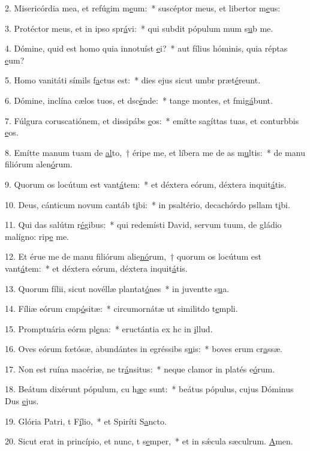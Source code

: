 2. Misericórdia mea, et refúgim m\uline{e}um:~* suscéptor meus, et libertor m\uline{e}us:\par 
3. Protéctor meus, et in ipso spr\uline{á}vi:~* qui subdit pópulum mum s\uline{u}b me.\par 
4. Dómine, quid est homo quia innotuíst \uline{e}i?~* aut fílius hóminis, quia réptas \uline{e}um?\par 
5. Homo vanitáti símils f\uline{a}ctus est:~* dies ejus sicut umbr præt\uline{é}reunt.\par 
6. Dómine, inclína cælos tuos, et dsc\uline{é}nde:~* tange montes, et fmig\uline{á}bunt.\par 
7. Fúlgura coruscatiónem, et dissipábs \uline{e}os:~* emítte sagíttas tuas, et conturbbis \uline{e}os.\par 
8. Emítte manum tuam de \uline{al}to,~† éripe me, et líbera me de as m\uline{u}ltis:~* de manu filiórum alen\uline{ó}rum.\par 
9. Quorum os locútum est vant\uline{á}tem:~* et déxtera eórum, déxtera inquit\uline{á}tis.\par 
10. Deus, cánticum novum cantáb t\uline{i}bi:~* in psaltério, decachórdo psllam t\uline{i}bi.\par 
11. Qui das salútm r\uline{é}gibus:~* qui redemísti David, servum tuum, de gládio malígno: rip\uline{e} me.\par 
12. Et érue me de manu filiórum alie\uline{nó}rum,~† quorum os locútum est vant\uline{á}tem:~* et déxtera eórum, déxtera inquit\uline{á}tis.\par 
13. Quorum fílii, sicut novéllæ plantat\uline{ó}nes~* in juventte s\uline{u}a.\par 
14. Fíliæ eórum cmp\uline{ó}sitæ:~* circumornátæ ut similitdo t\uline{e}mpli.\par 
15. Promptuária eórm pl\uline{e}na:~* eructántia ex hc in \uline{i}llud.\par 
16. Oves eórum fœtósæ, abundántes in egréssibs s\uline{u}is:~* boves erum cr\uline{a}ssæ.\par 
17. Non est ruína macériæ, ne tr\uline{á}nsitus:~* neque clamor in platés e\uline{ó}rum.\par 
18. Beátum dixérunt pópulum, cu h\uline{æ}c sunt:~* beátus pópulus, cujus Dóminus Dus \uline{e}jus.\par 
19. Glória Patri, t F\uline{í}lio,~* et Spiríti S\uline{a}ncto.\par 
20. Sicut erat in princípio, et nunc, t s\uline{e}mper,~* et in sǽcula sæculrum. \uline{A}men.\par 
